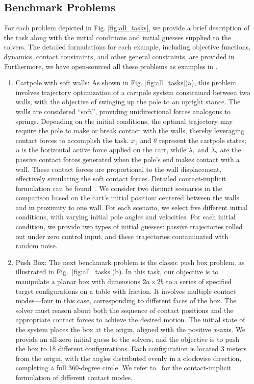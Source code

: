 \subsection{Benchmark Problems}
For each problem depicted in Fig. \ref{fig:all_tasks}, we provide a brief description of the task along with the initial conditions and initial guesses supplied to the solvers. The detailed formulations for each example, including objective functions, dynamics, contact constraints, and other general constraints, are provided in~. Furthermore, we have open-sourced all these problems as examples in \crisp.
\begin{enumerate}
\item Cartpole with soft walls: As shown in Fig. \ref{fig:all_tasks}(a), this problem involves trajectory optimization of a cartpole system constrained between two walls, with the objective of swinging up the pole to an upright stance. The walls are considered ``soft'', providing unidirectional forces analogous to springs. Depending on the initial conditions, the optimal trajectory may require the pole to make or break contact with the walls, thereby leveraging contact forces to accomplish the task. $x_1$ and $\theta$ represent the cartpole states; $u$ is the horizontal active force applied on the cart, while $\lambda_1$ and $\lambda_2$ are the passive contact forces generated when the pole's end makes contact with a wall. These contact forces are proportional to the wall displacement, effectively simulating the soft contact forces. 
Detailed contact-implicit formulation can be found~.
We consider two distinct scenarios in the comparison based on the cart's initial position: centered between the walls and in proximity to one wall. For each scenario, we select five different initial conditions, with varying initial pole angles and velocities. For each initial condition, we provide two types of initial guesses: passive trajectories rolled out under zero control input, and these trajectories contaminated with random noise.

\item Push Box: The next benchmark problem is the classic push box problem, as illustrated in Fig.~\ref{fig:all_tasks}(b). In this task, our objective is to manipulate a planar box with dimensions $2a \times 2b$ to a series of specified target configurations on a table with friction. It involves multiple contact modes---four in this case, corresponding to different faces of the box. The solver must reason about both the sequence of contact positions and the appropriate contact forces to achieve the desired motion.
The initial state of the system places the box at the origin, aligned with the positive $x$-axis. We provide an all-zero initial guess to the solvers, and the objective is to push the box to 18 different configurations. Each configuration is located 3 meters from the origin, with the angles distributed evenly in a clockwise direction, completing a full 360-degree circle. 
We refer to~ for the contact-implicit formulation of different contact modes.




\end{enumerate}
